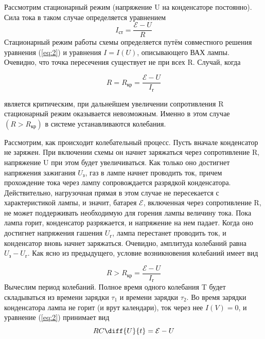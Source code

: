 Рассмотрим стационарный режим (напряжение U на конденсаторе постоянно). 
 Сила тока в таком случае определяется уравнением
\begin{equation}
\label{eq:2}
I_{\text{ст}}=\frac{\mathcal{E}-U}{R}
\end{equation}
Стационарный режим работы схемы определяется путём совместного решения уравнения (\ref{eq:2}) и уравнения $I=I(U)$, описывающего ВАХ лампы. Очевидно, что точка пересечения существует не при всех R. Случай, когда

\begin{equation}
R=R_{\text{кр}}=\frac{\mathcal{E}-U}{I_{\text{г}}}
\end{equation}

является критическим, при дальнейшем увеличении сопротивления R стационарный режим оказывается невозможным.
Именно в этом случае $(R>R_{\text{кр}})$ в системе устанавливаются колебания.


Рассмотрим, как происходит колебательный процесс. Пусть вначале конденсатор не заряжен. При включении схемы он начнет заряжаться через сопротивление R, напряжение U при этом будет увеличиваться. Как только оно достигнет напряжения зажигания $U_{\text{з}}$, газ в лампе начнет проводить ток, причем прохождение тока через лампу сопровождается разрядкой конденсатора. Действительно, нагрузочная прямая в этом случае не пересекается с характеристикой лампы, и значит, батарея $\mathcal{E}$, включенная через сопротивление R, не может поддерживать необходимую для горения лампы величину тока. Пока лампа горит, конденсатор разряжается, и напряжение на нем падает. Когда оно достигнет напряжения гашения $U_{\text{г}}$, лампа перестанет проводить ток, и конденсатор вновь начнет заряжаться. Очевидно, амплитуда колебаний равна $U_{\text{з}}-U_{\text{г}}$. Как ясно из предыдущего, условие возникновения колебаний имеет вид

\begin{equation}
R>R_{\text{кр}}=\frac{\mathcal{E}-U}{I_{\text{г}}}
\end{equation}
Вычеслим период колебаний. Полное время одного колебания T будет складываться из времени зарядки $\tau_1$ и времени зарядки $\tau_2$. Во время зарядки конденсатора лампа не горит (и врут календари), ток через нее $I(V)=0$, и уравнение (\ref{eq:2}) принимает вид
\begin{equation}
\label{eq:3}	
	RC\diff{U}{t}=\mathcal{E}-U
\end{equation}

